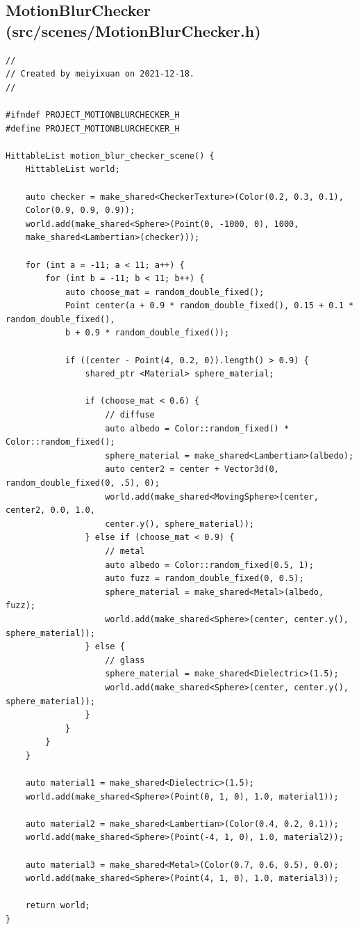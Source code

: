\documentclass[utf8]{article}
\begin{document}
\subsection{MotionBlurChecker (src/scenes/MotionBlurChecker.h)}
\begin{lstlisting}[style=CStyle]
//
// Created by meiyixuan on 2021-12-18.
//

#ifndef PROJECT_MOTIONBLURCHECKER_H
#define PROJECT_MOTIONBLURCHECKER_H

HittableList motion_blur_checker_scene() {
	HittableList world;
	
	auto checker = make_shared<CheckerTexture>(Color(0.2, 0.3, 0.1),
	Color(0.9, 0.9, 0.9));
	world.add(make_shared<Sphere>(Point(0, -1000, 0), 1000,
	make_shared<Lambertian>(checker)));
	
	for (int a = -11; a < 11; a++) {
		for (int b = -11; b < 11; b++) {
			auto choose_mat = random_double_fixed();
			Point center(a + 0.9 * random_double_fixed(), 0.15 + 0.1 * random_double_fixed(),
			b + 0.9 * random_double_fixed());
			
			if ((center - Point(4, 0.2, 0)).length() > 0.9) {
				shared_ptr <Material> sphere_material;
				
				if (choose_mat < 0.6) {
					// diffuse
					auto albedo = Color::random_fixed() * Color::random_fixed();
					sphere_material = make_shared<Lambertian>(albedo);
					auto center2 = center + Vector3d(0, random_double_fixed(0, .5), 0);
					world.add(make_shared<MovingSphere>(center, center2, 0.0, 1.0,
					center.y(), sphere_material));
				} else if (choose_mat < 0.9) {
					// metal
					auto albedo = Color::random_fixed(0.5, 1);
					auto fuzz = random_double_fixed(0, 0.5);
					sphere_material = make_shared<Metal>(albedo, fuzz);
					world.add(make_shared<Sphere>(center, center.y(), sphere_material));
				} else {
					// glass
					sphere_material = make_shared<Dielectric>(1.5);
					world.add(make_shared<Sphere>(center, center.y(), sphere_material));
				}
			}
		}
	}
	
	auto material1 = make_shared<Dielectric>(1.5);
	world.add(make_shared<Sphere>(Point(0, 1, 0), 1.0, material1));
	
	auto material2 = make_shared<Lambertian>(Color(0.4, 0.2, 0.1));
	world.add(make_shared<Sphere>(Point(-4, 1, 0), 1.0, material2));
	
	auto material3 = make_shared<Metal>(Color(0.7, 0.6, 0.5), 0.0);
	world.add(make_shared<Sphere>(Point(4, 1, 0), 1.0, material3));
	
	return world;
}


\end{lstlisting}
\end{document}
